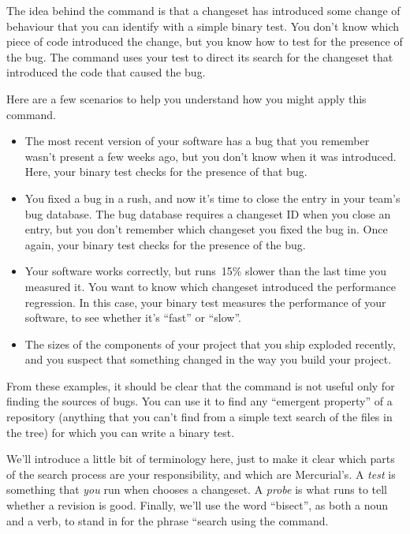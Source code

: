 The idea behind the  command is that a changeset has
introduced some change of behaviour that you can identify with a
simple binary test.  You don't know which piece of code introduced the
change, but you know how to test for the presence of the bug.  The
 command uses your test to direct its search for the
changeset that introduced the code that caused the bug.

Here are a few scenarios to help you understand how you might apply
this command.
\begin{itemize}
\item The most recent version of your software has a bug that you
  remember wasn't present a few weeks ago, but you don't know when it
  was introduced.  Here, your binary test checks for the presence of
  that bug.
\item You fixed a bug in a rush, and now it's time to close the entry
  in your team's bug database.  The bug database requires a changeset
  ID when you close an entry, but you don't remember which changeset
  you fixed the bug in.  Once again, your binary test checks for the
  presence of the bug.
\item Your software works correctly, but runs~15\% slower than the
  last time you measured it.  You want to know which changeset
  introduced the performance regression.  In this case, your binary
  test measures the performance of your software, to see whether it's
  ``fast'' or ``slow''.
\item The sizes of the components of your project that you ship
  exploded recently, and you suspect that something changed in the way
  you build your project.
\end{itemize}

From these examples, it should be clear that the 
command is not useful only for finding the sources of bugs.  You can
use it to find any ``emergent property'' of a repository (anything
that you can't find from a simple text search of the files in the
tree) for which you can write a binary test.

We'll introduce a little bit of terminology here, just to make it
clear which parts of the search process are your responsibility, and
which are Mercurial's.  A \emph{test} is something that \emph{you} run
when  chooses a changeset.  A \emph{probe} is what
 runs to tell whether a revision is good.  Finally,
we'll use the word ``bisect'', as both a noun and a verb, to stand in
for the phrase ``search using the  command.

